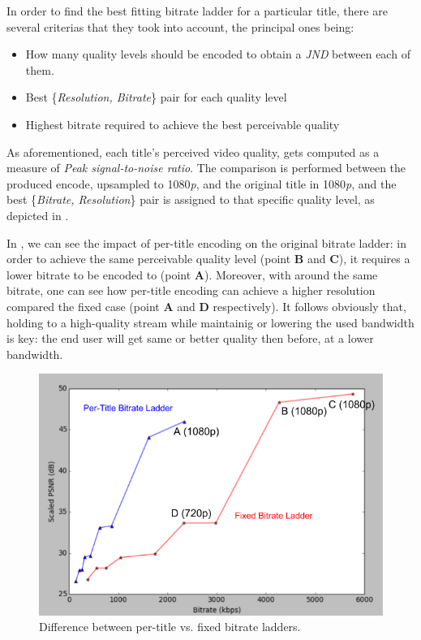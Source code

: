 In order to find the best fitting bitrate ladder for a particular title, there
are several criterias that they took into account, the principal ones being:

\begin{itemize}
    \item How many quality levels should be encoded to obtain a
          \emph{JND} between each of them.
    \item Best \{\emph{Resolution, Bitrate}\} pair for each quality level
    \item Highest bitrate required to achieve the best perceivable quality
\end{itemize}

As aforementioned, each title's perceived video quality, gets computed as a
measure of \emph{Peak signal-to-noise ratio}. The comparison is performed
between the produced encode, upsampled to 1080\emph{p}, and the original title
in 1080\emph{p}, and the best \{\emph{Bitrate, Resolution}\} pair is assigned
to that specific quality level, as depicted in .

In , we can see the impact of per-title encoding on
the original bitrate ladder: in order to achieve the same perceivable quality
level (point \textbf{B} and \textbf{C}), it requires a lower bitrate to be
encoded to (point \textbf{A}).  Moreover, with around the same bitrate, one can
see how per-title encoding can achieve a higher resolution compared the fixed
case (point \textbf{A} and \textbf{D} respectively). It follows obviously that,
holding to a high-quality stream while maintainig or lowering the used
bandwidth is key: the end user will get same or better quality then before, at
a lower bandwidth.

\begin{figure}[!htb]
  \centering
  \includegraphics[width=0.9\columnwidth]{img/pertitlevsfixed.png}
  \caption{Difference between per-title vs. fixed bitrate ladders.}
  \label{fig:new-vs-old-ladder}
\end{figure}


